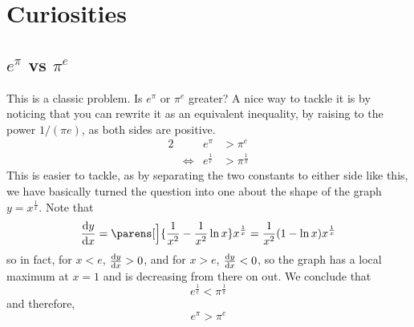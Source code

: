 \section{Curiosities}

\subsection[\texorpdfstring{\(e^\pi\) vs \(\pi^e\)}{e\^{}pi vs pi\^{}e}]
           {\boldmath\(e^\pi\) vs \(\pi^e\)}

This is a classic problem. Is \(e^\pi\) or \(\pi^e\) greater? A nice way to
tackle it is by noticing that you can rewrite it as an equivalent inequality, by
raising to the power \(1 / (\pi e)\), as both sides are positive.
\begin{alignat*}2
 && e^\pi &> \pi^e \\
 &\iff{}& e^{\frac 1e} &> \pi^{\frac 1\pi}
\end{alignat*}
This is easier to tackle, as by separating the two constants to either side like
this, we have basically turned the question into one about the shape of the
graph \(y = x^{\frac 1x}\). Note that
\begin{equation*}
 \dv<y>{x} = \parens[\Big]{\frac 1{x^2} - \frac 1{x^2}\ln x} x^{\frac 1x}
           = \frac 1{x^2} (1 - \ln x) x^{\frac 1x}
\end{equation*}
so in fact, for \(x < e\), \(\dv<y>{x} > 0\), and for
\(x > e\), \(\dv<y>{x} < 0\), so the graph has a local maximum at \(x = 1\) and
is decreasing from there on out. We conclude that
\begin{equation*}
 e^{\frac 1e} < \pi^{\frac 1\pi}
\end{equation*}
and therefore,
\begin{equation*}
 e^\pi > \pi^e
\end{equation*}
